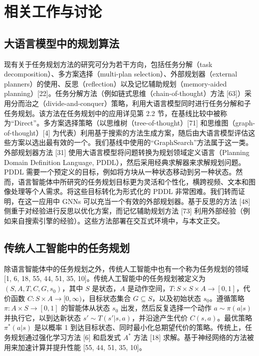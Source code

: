 \documentclass[11pt,UTF8,fontset=fandol]{ctexart}
\begin{document}
\appendix
\renewcommand{\thesection}{\Alph{section}}

\section{相关工作与讨论}
\subsection{大语言模型中的规划算法}

现有关于任务规划方法的研究可分为若干方向，包括任务分解（task decomposition）、多方案选择（multi-plan selection）、外部规划器（external planners）的使用、反思（reflection）以及记忆辅助规划（memory-aided planning）[22]。任务分解方法（例如链式思维（chain-of-thought）方法 [63]）采用分而治之（divide-and-conquer）策略，利用大语言模型同时进行任务分解和子任务规划。该方法在任务规划中的应用详见第 2.2 节，在基线比较中被称为“Direct”。多方案选择策略（以思维树（tree-of-thought）[71] 和思维图（graph-of-thought）[4] 为代表）利用基于搜索的方法生成方案，随后由大语言模型评估这些方案以选出最有效的一个。我们基线中使用的“GraphSearch”方法属于这一类。外部规划器方法 [31] 使用大语言模型将问题转换为规划领域定义语言（Planning Domain Definition Language, PDDL），然后采用经典求解器来求解规划问题。PDDL 需要一个预定义的目标，例如将方块从一种状态移动到另一种状态。然而，语言智能体中所研究的任务规划目标更为灵活和个性化，横跨视频、文本和图像处理等个人需求。将这些目标转化为形式化的 PDDL 非常困难。我们转而证明，在这一应用中 GNNs 可以充当一个有效的外部规划器。基于反思的方法 [48] 侧重于对经验进行反思以优化方案，而记忆辅助规划方法 [73] 利用外部经验（例如来自搜索引擎的经验）。这些方法部署在交互式环境中，与本文正交。

\subsection{传统人工智能中的任务规划}

除语言智能体中的任务规划之外，传统人工智能中也有一个称为任务规划的领域 [1, 6, 18, 55, 44, 51, 35, 10]。传统人工智能中的任务规划被定义为 $(S, A, T, C, G, s_0)$，其中 $S$ 是状态，$A$ 是动作空间，$T: S\times S\times A\to[0,1]$，代价函数 $C: S\times A\to[0,\infty)$，目标状态集合 $G\subseteq S$，以及初始状态 $s_0$。遵循策略 $\pi: A\times S\to[0,1]$ 的智能体从状态 $s_0$ 出发，然后反复选择一个动作 $a\sim\pi(a|s)$ 并执行它，以到达新状态 $s'\sim T(s'|s,a)$，并沿途产生代价 $C(s,a)$。最优策略 $\pi^*(a|s)$ 是以概率 1 到达目标状态、同时最小化总期望代价的策略。传统上，任务规划通过强化学习方法 [6] 和启发式 $A^*$ 方法 [18] 求解。基于神经网络的方法被用来加速计算并提升性能 [55, 44, 51, 35, 10]。
\end{document}
